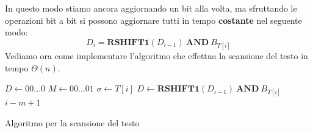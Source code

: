 In questo modo stiamo ancora aggiornando un bit alla volta, ma sfruttando le
operazioni bit a bit si possono aggiornare tutti in tempo \textbf{costante} nel
seguente modo:
\begin{equation}
    D_i = \textbf{RSHIFT1}(D_{i - 1}) \ \textbf{AND} \ B_{T[i]}
\end{equation}
Vediamo ora come implementare l'algoritmo che effettua la scansione del testo in
tempo $\Theta(n)$.
\begin{algorithm}[!ht]
    \begin{algorithmic}
        \State $D \gets 00\dots0$
        \State $M \gets 00\dots01$
        \State $\sigma \gets T[i]$
        \State $D \gets \textbf{RSHIFT1}(D_{i - 1}) \ \textbf{AND} \ B_{T[i]}$
        \State {} $i - m + 1$
        \EndIf
        \EndFor
        \EndFunction
    \end{algorithmic}
    \caption{Algoritmo per la scansione del testo}
\end{algorithm}

